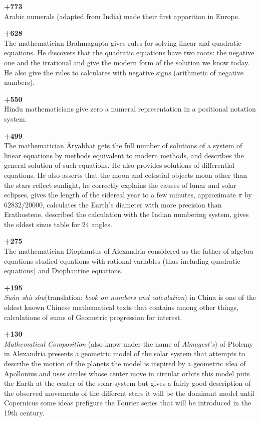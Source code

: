 \textbf{+773}\\
Arabic numerals (adapted from India) made their first apparition in Europe.

\textbf{+628}\\
The mathematician Brahmagupta gives rules for solving linear and quadratic equations. He discovers that the quadratic equations have two roots: the negative one and the irrational and give the modern form of the solution we know today. He also give the rules to calculates with negative signs (arithmetic of negative numbers).

\textbf{+550}\\
Hindu mathematicians give zero a numeral representation in a positional notation system.

\textbf{+499}\\
The mathematician Âryabhat gets the full number of solutions of a system of linear equations by methods equivalent to modern methods, and describes the general solution of such equations. He also provides solutions of differential equations. He also asserts that the moon and celestial objects moon other than the stars reflect sunlight, he correctly explains the causes of lunar and solar eclipses, gives the length of the sidereal year to a few minutes, approximate $\pi$ by $62832/20000$, calculates the Earth's diameter with more precision than Erathostene, described the calculation with the Indian numbering system, gives the oldest sinus table for $24$ angles.

\textbf{+275}\\
The mathematician Diophantus of Alexandria considered as the father of algebra equations studied equations with rational variables (thus including quadratic equations) and Diophantine equations.

\textbf{+195}\\
\textit{Suàn shù shu}(translation: \textit{book on numbers and calculation}) in China is one of the oldest known Chinese mathematical texts that contains among other things, calculations of sums of Geometric progression for interest.

\textbf{+130}\\
\textit{Mathematical Composition} (also know under the name of \textit{Almagest's}) of Ptolemy in Alexandria presents a geometric model of the solar system that attempts to describe the motion of the planets the model is inspired by a geometric idea of Apollonius and uses circles whose center move in circular orbits this model puts the Earth at the center of the solar system but gives a fairly good description of the observed movements of the different stars it will be the dominant model until Copernicus some ideas prefigure the Fourier series that will be introduced in the 19th century.

